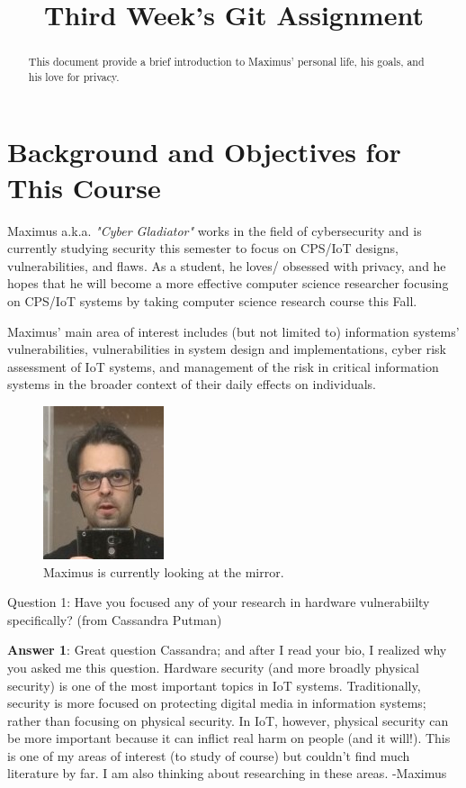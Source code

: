 


 \title{Third Week's Git Assignment} 

 \maketitle


\begin{abstract}
This document provide a brief introduction to Maximus' personal life, his goals, and his love for privacy.
\end{abstract}
\section{Background and Objectives for This Course}
Maximus a.k.a. \emph{"Cyber Gladiator"} works in the field of cybersecurity and is currently studying security this semester to focus on CPS/IoT designs, vulnerabilities, and flaws. As a student, he loves/ obsessed with privacy, and he hopes that he will become a more effective computer science researcher focusing on CPS/IoT systems by taking computer science research course this Fall.

Maximus' main area of interest includes (but not limited to) information systems’ vulnerabilities, vulnerabilities in system design and implementations, cyber risk assessment of IoT systems, and management of the risk in critical information systems in the broader context of their daily effects on individuals.


\begin{figure}[htbp]
\centerline{\includegraphics{a481.jpg}}
\caption{Maximus is currently looking at the mirror.}
\label{fig}
\end{figure}

Question 1: Have you focused any of your research in hardware vulnerabiilty specifically?  (from Cassandra Putman)  

\textbf{Answer 1}: Great question Cassandra; and after I read your bio, I realized why you asked me this question.  Hardware security (and more broadly physical security) is one of the most important topics in IoT systems. Traditionally, security is more focused on protecting digital media in information systems; rather than focusing on physical security. In IoT, however, physical security can be more important because it can inflict real harm on people (and it will!). This is one of my areas of interest (to study of course) but couldn't find much literature by far. I am also thinking about researching in these areas. -Maximus